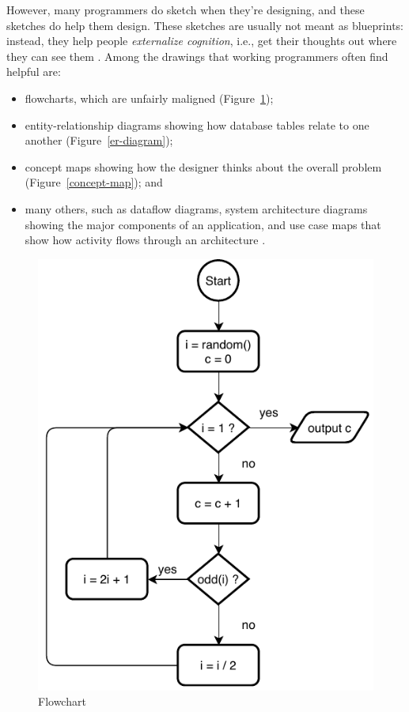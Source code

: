 \documentclass[10pt,letterpaper]{article}
\begin{document}
However,
many programmers do sketch when they're designing,
and these sketches do help them design.
These sketches are usually not meant as blueprints:
instead,
they help people \emph{externalize cognition},
i.e.,
get their thoughts out where they can see them \cite{Cherubini2007,Petre2016}.
Among the drawings that working programmers often find helpful are:

\begin{itemize}
\item
  flowcharts, which are unfairly maligned \cite{Scanlan1989}
  (Figure~\ref{flowchart});
\item
  entity-relationship diagrams showing how database tables relate to one another
  (Figure~\ref{er-diagram});
\item
  concept maps showing how the designer thinks about the overall problem
  (Figure~\ref{concept-map}); and
\item
  many others,
  such as dataflow diagrams,
  system architecture diagrams showing the major components of an application,
  and use case maps that show how activity flows through an architecture \cite{Reekie2006}.
\end{itemize}

\begin{figure}
  \centering
  \includegraphics[scale=0.6]{flowchart.pdf}
  \caption{Flowchart}
  \label{flowchart}
\end{figure}
\end{document}
